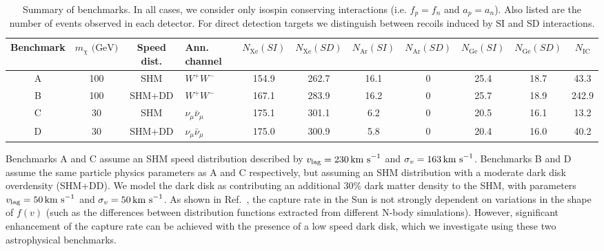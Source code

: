 \begin{table}[pht!]
  \setlength{\extrarowheight}{3pt}
  \begin{center}
\begin{sideways}
	\begin{tabular}{c|ccm{2cm}|ccccccc}
        \hline\hline
	Benchmark & $m_\chi \textrm{ (GeV)}$ & Speed dist. & Ann. channel & $N_{\mathrm{Xe}}(SI)$ & $N_{\mathrm{Xe}}(SD)$  & $N_{\mathrm{Ar}}(SI)$ & $N_{\mathrm{Ar}}(SD)$ & $N_{\textrm{Ge}}(SI)$ & $N_{\textrm{Ge}}(SD)$ & $N_{\textrm{IC}}$ \\
	\hline
        A & 100 & SHM & $W^{+}W^{-}$ & 154.9 & 262.7 & 16.1 & 0 & 25.4 & 18.7 & 43.3\\
        B & 100 & SHM+DD & $W^{+}W^{-}$ & 167.1 & 283.9 & 16.2 & 0 & 25.7 & 18.9 & 242.9\\
        C & 30  & SHM & $\nu_\mu \bar{\nu}_\mu$ & 175.1 & 301.1 & 6.2 & 0 & 20.5 & 16.1 & 13.2\\
        D & 30  & SHM+DD & $\nu_\mu \bar{\nu}_\mu$ & 175.0 & 300.9 & 5.8 & 0 & 20.4 & 16.0 & 40.2\\
        \hline\hline
	\end{tabular}
\end{sideways}
  \end{center}
\caption[Summary of benchmarks used in Chapter~\ref{ch:NT}]{Summary of benchmarks. In all cases, we consider only isospin conserving interactions (i.e. $f_p = f_n$ and $a_p = a_n$). Also listed are the number of events observed in each detector. For direct detection targets we distinguish between recoils induced by SI and SD interactions.}
\label{tab:NT:benchmarks}
\end{table}

Benchmarks A and C assume an SHM speed distribution described by $v_\textrm{lag} = 230 \,\textrm{km s}^{-1}$ and $\sigma_v = 163 \,\textrm{km s}^{-1}$. Benchmarks B and D assume the same particle physics parameters as A and C respectively, but assuming an SHM distribution with a moderate dark disk overdensity (SHM+DD). We model the dark disk as contributing an additional 30\% dark matter density to the SHM, with parameters $v_\textrm{lag} = 50 \,\textrm{km s}^{-1}$ and $\sigma_v = 50 \,\textrm{km s}^{-1}$. As shown in Ref.~\cite{Choi:2013}, the capture rate in the Sun is not strongly dependent on variations in the shape of $f(v)$ (such as the differences between distribution functions extracted from different N-body simulations). However, significant enhancement of the capture rate can be achieved with the presence of a low speed dark disk, which we investigate using these two astrophysical benchmarks.


